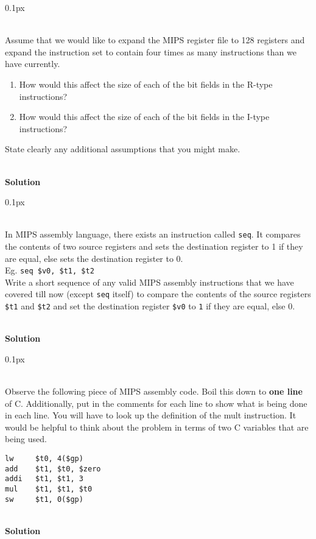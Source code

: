 \documentclass[11pt]{article}
\newcommand{\problem}[1]{\begin{adjustwidth}{0.1px}\noindent \framebox[1.2\width]{\large Problem #1}\end{adjustwidth} \bigskip\\}
\newcommand{\code}[1]{{\texttt{#1}}}
\begin{document}
\newpage
\problem{5}
Assume that we would like to expand the MIPS register file to 128 registers and expand the instruction set to contain four times as many instructions than we have currently.
\begin{enumerate}
    \item How would this affect the size of each of the bit fields in the R-type instructions?
    \item How would this affect the size of each of the bit fields in the I-type instructions? 
\end{enumerate}
State clearly any additional assumptions that you might make.

\bigskip \\
\textbf{Solution}\\








\newpage
\problem{6}
In MIPS assembly language, there exists an instruction called \code{seq}. It compares the contents of two source registers and sets the destination register to 1 if they are equal, else sets the destination register to 0. \\
Eg. \code{seq \$v0, \$t1, \$t2}
\\
Write a short sequence of any valid MIPS assembly instructions that we have covered till now (except \code{seq} itself) to compare the contents of the source registers \code{\$t1} and \code{\$t2} and set the destination register \code{\$v0} to \code{1} if they are equal, else 0.


\bigskip \\
\textbf{Solution}\\








\newpage
\problem{7}
Observe the following piece of MIPS assembly code. Boil this down to \textbf{one line} of C. Additionally, put in the comments for each line to show what is being done in each line. You will have to look up the definition of the mult instruction. It would be helpful to think about the problem in terms of two C variables that are being used.
\begin{lstlisting}[style=MIPS]
lw     $t0, 4($gp)      	
add    $t1, $t0, $zero   	
addi   $t1, $t1, 3       	
mul    $t1, $t1, $t0     	
sw     $t1, 0($gp)
\end{lstlisting}
\bigskip \\
\textbf{Solution}\\
\end{document}
